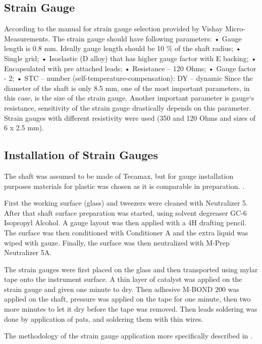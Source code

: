 	\subsection{Strain Gauge}
	\label{sec:SGReq}
	According to the manual for strain gauge selection provided by Vishay Micro-Measurements. The strain gauge should have following parameters:
	• Gauge length is 0.8 mm. Ideally gauge length should be 10 \% of the shaft radius;
	• Single grid;
	• Isoelastic (D alloy) that has higher gauge factor with E backing;
	• Encapsulated with pre attached leads;
	• Resistance – 120 Ohms;
	• Gauge factor - 2;
	• STC – number (self-temperature-compensation): DY – dynamic
	Since the diameter of the shaft is only 8.5 mm, one of the most important parameters, in this
	case, is the size of the strain gauge. Another important parameter is gauge‘s resistance, sensitivity
	of the strain gauge drastically depends on this parameter. Strain gauges with different resistivity
	were used (350 and 120 Ohms and sizes of 6 x 2.5 mm).

	\subsection{Installation of Strain Gauges}
	\label{sec:instSG}

	The shaft was assumed to be made of Tecamax, but for gauge installation purposes materials for plastic was chosen as it is comparable in preparation. \cite{StrGugeInst}.

	First the working surface (glass) and tweezers were cleaned with Neutralizer 5. After that shaft surface preparation was started, using solvent degreaser GC-6 Isopropyl Alcohol. A gauge layout was then applied with a 4H drafting pencil. The surface was then conditioned with Conditioner A and the extra liquid was wiped with gauze. Finally, the surface was then neutralized with M-Prep Neutralizer 5A. \cite{StrGugeInst}

	The strain gauges were first placed on the glass and then transported using mylar tape onto the instrument surface. A thin layer of catalyst was applied on the strain gauge and given one minute to dry. Then adhesive M-BOND 200 was applied on the shaft, pressure was applied on the tape for one minute, then two more minutes to let it dry before the tape was removed. Then leads soldering was done by application of pats, and soldering them with thin wires. \cite{youtube}

	The methodology of the strain gauge application more specifically described in \cite{StrGugeInst}.

